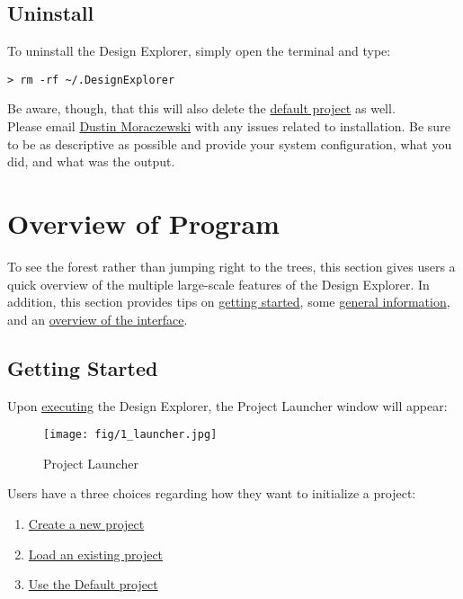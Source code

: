 \documentclass[10pt]{article}
\begin{document}
	\subsection*{Uninstall}
	\label{ininstall}
		To uninstall the Design Explorer, simply open the terminal and type:
\begin{lstlisting}
> rm -rf ~/.DesignExplorer
\end{lstlisting}
		Be aware, though, that this will also delete the \hyperref[subsec:default]{default project} as well. \\
		\vfill
		Please email \href{mailto:dmoracze@umd.edu}{Dustin Moraczewski} with any issues related to installation.
		Be sure to be as descriptive as possible and provide your system configuration, what you did, and what was the output.
\newpage


\section{Overview of Program}
\label{sec:overview}
	To see the forest rather than jumping right to the trees, this section gives users a quick overview of the multiple large-scale features of the Design Explorer.
	In addition, this section provides tips on \hyperref[subsec:start]{getting started}, some \hyperref[subsec:general]{general information}, and an \hyperref[subsec:overview]{overview of the interface}.

	\subsection*{Getting Started}
	\label{subsec:start}
		Upon \hyperref[subsec:run]{executing} the Design Explorer, the Project Launcher window will appear:
		\vspace{3mm}
		\begin{figure}[ht]
		\centering
		\texttt{[image: fig/1\_launcher.jpg]}
		\caption{Project Launcher}
		\label{fig:launch}
		\end{figure}

		Users have a three choices regarding how they want to initialize a project:
		\begin{enumerate}
			\item \hyperref[subsubsec:new]{Create a new project}
			\item \hyperref[subsubsec:load]{Load an existing project}
			\item \hyperref[subsec:default]{Use the Default  project}
		\end{enumerate}
\end{document}
